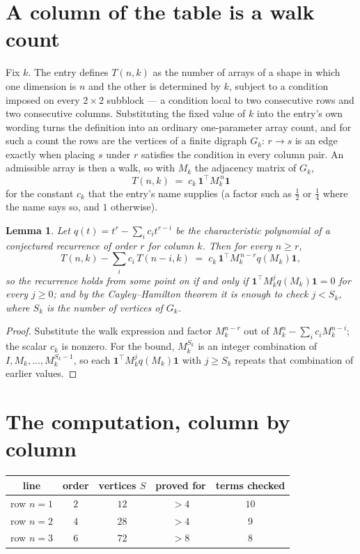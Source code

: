 \documentclass[11pt,a4paper]{article}
\theoremstyle{plain}
\newtheorem{lemma}[theorem]{Lemma}
\theoremstyle{definition}
\begin{document}
\section{A column of the table is a walk count}

Fix $k$. The entry defines $T(n,k)$ as the number of arrays of a shape in which one dimension
is $n$ and the other is determined by $k$, subject to a condition imposed on every
$2\times2$ subblock --- a condition local to two consecutive rows and two consecutive columns.
Substituting the fixed value of $k$ into the entry's own wording turns the definition into an
ordinary one-parameter array count, and for such a count the rows are the vertices of a finite
digraph $G_k$: $r\to s$ is an edge exactly when placing $s$ under $r$ satisfies the condition
in every column pair. An admissible array is then a walk, so with $M_k$ the adjacency matrix
of $G_k$,
\[
T(n,k)\;=\;c_k\,\mathbf{1}^{\!\top}M_k^{\,n}\mathbf{1}
\]
for the constant $c_k$ that the entry's name supplies (a factor such as $\tfrac12$ or
$\tfrac14$ where the name says so, and $1$ otherwise).

\begin{lemma}\label{lem:crit}
Let $q(t)=t^{r}-\sum_i c_it^{r-i}$ be the characteristic polynomial of a conjectured
recurrence of order $r$ for column $k$. Then for every $n\ge r$,
\[
T(n,k)-\sum_i c_i\,T(n-i,k)\;=\;c_k\,\mathbf{1}^{\!\top}M_k^{\,n-r}q(M_k)\mathbf{1},
\]
so the recurrence holds from some point on if and only if
$\mathbf{1}^{\!\top}M_k^{j}q(M_k)\mathbf{1}=0$ for every $j\ge0$; and by the
Cayley--Hamilton theorem it is enough to check $j<S_k$, where $S_k$ is the number of vertices
of $G_k$.
\end{lemma}

\begin{proof}
Substitute the walk expression and factor $M_k^{n-r}$ out of $M_k^{n}-\sum_ic_iM_k^{n-i}$;
the scalar $c_k$ is nonzero. For the bound, $M_k^{S_k}$ is an integer combination of
$I,M_k,\dots,M_k^{S_k-1}$, so each $\mathbf{1}^{\!\top}M_k^{j}q(M_k)\mathbf{1}$ with
$j\ge S_k$ repeats that combination of earlier values.
\end{proof}

\section{The computation, column by column}

\begin{center}
\begin{tabular}{ccccc}
line & order & vertices $S$ & proved for & terms checked \\ \hline
row $n$$=1$ & $2$ & $12$ & $>4$ & $10$ \\
row $n$$=2$ & $4$ & $28$ & $>4$ & $9$ \\
row $n$$=3$ & $6$ & $72$ & $>8$ & $8$ \\
\end{tabular}
\end{center}
\end{document}
